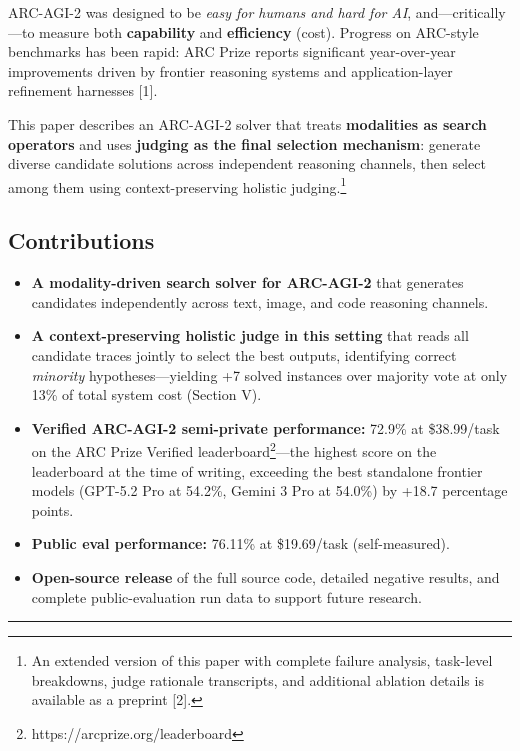 \documentclass[conference]{IEEEtran}
\providecommand{\tightlist}{%
  \setlength{\itemsep}{0pt}\setlength{\parskip}{0pt}}
\begin{document}
ARC-AGI-2 was designed to be \emph{easy for humans and hard for AI},
and---critically---to measure both \textbf{capability} and
\textbf{efficiency} (cost). Progress on ARC-style benchmarks has been
rapid: ARC Prize reports significant year-over-year improvements driven
by frontier reasoning systems and application-layer refinement harnesses
{[}1{]}.

This paper describes an ARC-AGI-2 solver that treats \textbf{modalities
as search operators} and uses \textbf{judging as the final selection
mechanism}: generate diverse candidate solutions across independent
reasoning channels, then select among them using context-preserving
holistic judging.\footnote{An extended version of this paper with
  complete failure analysis, task-level breakdowns, judge rationale
  transcripts, and additional ablation details is available as a
  preprint {[}2{]}.}

\subsection{Contributions}\label{contributions}

\begin{itemize}
\tightlist
\item
  \textbf{A modality-driven search solver for ARC-AGI-2} that generates
  candidates independently across text, image, and code reasoning
  channels.
\item
  \textbf{A context-preserving holistic judge in this setting} that
  reads all candidate traces jointly to select the best outputs,
  identifying correct \emph{minority} hypotheses---yielding +7 solved
  instances over majority vote at only 13\% of total system cost
  (Section V).
\item
  \textbf{Verified ARC-AGI-2 semi-private performance:} 72.9\% at
  \$38.99/task on the ARC Prize Verified leaderboard\footnote{https://arcprize.org/leaderboard}---the
  highest score on the leaderboard at the time of writing, exceeding the
  best standalone frontier models (GPT-5.2 Pro at 54.2\%, Gemini 3 Pro
  at 54.0\%) by +18.7 percentage points.
\item
  \textbf{Public eval performance:} 76.11\% at \$19.69/task
  (self-measured).
\item
  \textbf{Open-source release} of the full source code, detailed
  negative results, and complete public-evaluation run data to support
  future research.
\end{itemize}

\begin{center}\rule{0.5\linewidth}{0.5pt}\end{center}
\end{document}
